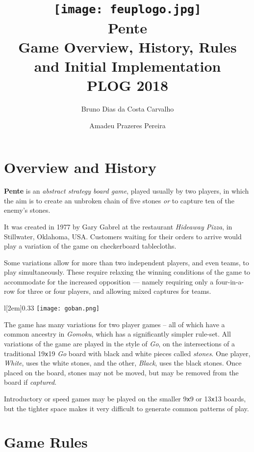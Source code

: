 \documentclass[12pt,a4paper,notitlepage]{article}
\title{
	\vspace{-2\baselineskip}
	\texttt{[image: feuplogo.jpg]}\\
	{\Huge Pente}\\
	{\Large Game Overview, History, Rules and Initial Implementation}\\
	{\normalsize PLOG 2018}
}
\author{
	Bruno Dias da Costa Carvalho\hspace*{1.5em}\text{up201606517}
	\and
	Amadeu Prazeres Pereira\hspace*{1.5em}\text{up201605646} 
}
\newcommand*{\boardsize}[1]{#1\texttt{x}#1}
\begin{document}
\maketitle
\thispagestyle{empty}

\section{Overview and History}
\label{sec:overview}

\textbf{Pente} is an \textit{abstract strategy board game}, played usually by two players, in which the aim is to create an unbroken chain of five stones \emph{or} to capture ten of the enemy's stones.

It was created in 1977 by Gary Gabrel at the restaurant \textsl{Hideaway Pizza}, in Stillwater, Oklahoma, USA.\supercite{pente-wikipedia}
Customers waiting for their orders to arrive would play a variation of the game on checkerboard tablecloths.\supercite{pente-wikipedia}

Some variations allow for more than two independent players, and even teams, to play simultaneously. These require relaxing the winning conditions of the game to accommodate for the increased opposition --- namely requiring only a four-in-a-row for three or four players, and allowing mixed captures for teams.\supercite{pente-winning-moves}

\begin{wrapfigure}[12]{l}[2em]{0.33\textwidth}
	\vspace*{-1\baselineskip}
	\texttt{[image: goban.png]}
	\caption{\boardsize{19} \textit{Go} board. \label{fig:goban}}
\end{wrapfigure}

The game has many variations for two player games -- all of which have a common ancestry in \textit{Gomoku}, which has a significantly simpler rule-set.
All variations of the game are played in the style of \textit{Go}, on the intersections of a traditional \boardsize{19} \emph{Go} board with black and white pieces called \emph{stones}. One player, \textsl{White}, uses the white stones, and the other, \textsl{Black}, uses the black stones. Once placed on the board, stones may not be moved, but may be removed from the board if \emph{captured}.

Introductory or speed games may be played on the smaller \boardsize{9} or \boardsize{13} boards, but the tighter space makes it very difficult to generate common patterns of play.

\section{Game Rules}
\label{sec:rules}
\end{document}
